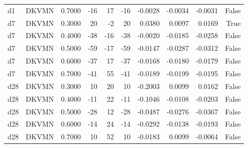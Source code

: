 \begin{tabular}{llrrrrrrrr}
d1 & DKVMN & 0.7000 & -16 & 17 & -16 & -0.0028 & -0.0034 & -0.0031 & False \\
d7 & DKVMN & 0.3000 & 20 & -2 & 20 & 0.0380 & 0.0097 & 0.0169 & True \\
d7 & DKVMN & 0.4000 & -38 & -16 & -38 & -0.0020 & -0.0185 & -0.0258 & False \\
d7 & DKVMN & 0.5000 & -59 & -17 & -59 & -0.0147 & -0.0287 & -0.0312 & False \\
d7 & DKVMN & 0.6000 & -37 & 17 & -37 & -0.0168 & -0.0180 & -0.0179 & False \\
d7 & DKVMN & 0.7000 & -41 & 55 & -41 & -0.0189 & -0.0199 & -0.0195 & False \\
d28 & DKVMN & 0.3000 & 10 & 20 & 10 & -0.2003 & 0.0099 & 0.0162 & False \\
d28 & DKVMN & 0.4000 & -11 & 22 & -11 & -0.1046 & -0.0108 & -0.0203 & False \\
d28 & DKVMN & 0.5000 & -28 & 12 & -28 & -0.0487 & -0.0276 & -0.0367 & False \\
d28 & DKVMN & 0.6000 & -14 & 24 & -14 & -0.0292 & -0.0138 & -0.0193 & False \\
d28 & DKVMN & 0.7000 & 10 & 52 & 10 & -0.0183 & 0.0099 & -0.0064 & False \\
\bottomrule
\end{tabular}
